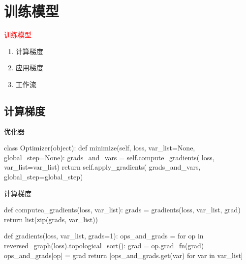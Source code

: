 \section{训练模型}
\label{sec:train-model}

\begin{frame}
  \begin{center}
    \Huge{\textcolor{red}{训练模型}}
  \end{center}

  \begin{enumerate}
    \item \alert{计算梯度}
    \item \alert{应用梯度}    
    \item \alert{工作流}
  \end{enumerate}    
\end{frame}

\subsection{计算梯度}

\begin{frame}[fragile]{优化器}
  \begin{python} 
class Optimizer(object):
  def minimize(self, loss, var_list=None, global_step=None):
    grads_and_vars = self.compute_gradients(
      loss, var_list=var_list)
    return self.apply_gradients(
      grads_and_vars, 
      global_step=global_step)
  \end{python}
\end{frame}

\begin{frame}[fragile]{计算梯度}
  \begin{python} 
def computea_gradients(loss, var_list):
  grads = gradients(loss, var_list, grad)
  return list(zip(grads, var_list))

def gradients(loss, var_list, grads=1):
  ops_and_grads = {}
  for op in reversed_graph(loss).topological_sort():
    grad = op.grad_fn(grad)
    ops_and_grads[op] = grad
  return [ops_and_grads.get(var) for var in var_list]
  \end{python}
\end{frame}

